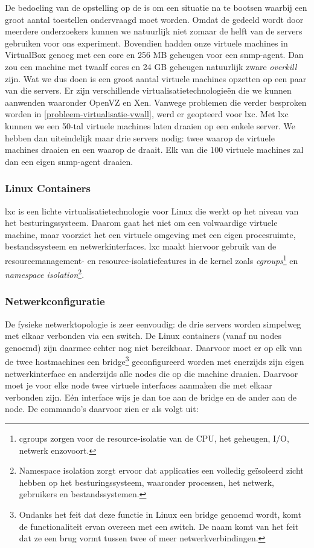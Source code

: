 De bedoeling van de opstelling op de \vwall{}  is om een situatie na te bootsen waarbij een groot aantal toestellen ondervraagd moet worden.
Omdat de \vwall{} gedeeld wordt door meerdere onderzoekers kunnen we natuurlijk niet zomaar de helft van de servers gebruiken voor ons experiment.
Bovendien hadden onze virtuele machines in VirtualBox genoeg met een core en 256 MB geheugen voor een \gls{snmp-agent}.
Dan zou een machine met twaalf cores en 24 GB geheugen natuurlijk zware \textit{overkill} zijn.
Wat we dus doen is een groot aantal virtuele machines opzetten op een paar van die servers.
Er zijn verschillende virtualisatietechnologieën die we kunnen aanwenden waaronder OpenVZ en Xen.
Vanwege problemen die verder besproken worden in \cref{probleem-virtualisatie-vwall}, werd er geopteerd voor \gls{lxc}.
Met \gls{lxc} kunnen we een 50-tal virtuele machines laten draaien op een enkele server.
We hebben dan uiteindelijk maar drie servers nodig: twee waarop de virtuele machines draaien en een waarop de \nwmretriever{} draait.
Elk van die 100 virtuele machines zal dan een eigen \gls{snmp-agent} draaien.

\subsubsection{Linux Containers}
\label{lxc}

\gls{lxc} is een lichte virtualisatietechnologie voor Linux die werkt op het niveau van het besturingssysteem.
Daarom gaat het niet om een volwaardige virtuele machine, maar voorziet het een virtuele omgeving met een eigen procesruimte, bestandssysteem en netwerkinterfaces.
\gls{lxc} maakt hiervoor gebruik van de resourcemanagement- en resource-isolatiefeatures in de kernel zoals \textit{\gls{cgroups}}\footnote{
	\gls{cgroups} zorgen voor de resource-isolatie van de CPU, het geheugen, I/O, netwerk enzovoort\cite{lxc-wiki}.
} en \textit{namespace isolation}\footnote{
	Namespace isolation zorgt ervoor dat applicaties een volledig geïsoleerd zicht hebben op het besturingssysteem,
	waaronder processen, het netwerk, gebruikers en bestandssystemen\cite{lxc-wiki}.
}\cite{lxc-explained, lxc-wiki}.


\subsubsection{Netwerkconfiguratie}

De fysieke netwerktopologie is zeer eenvoudig: de drie servers worden simpelweg met elkaar verbonden via een switch.
De Linux containers (vanaf nu nodes genoemd) zijn daarmee echter nog niet bereikbaar.
Daarvoor moet er op elk van de twee hostmachines een bridge\footnote{
	Ondanks het feit dat deze functie in Linux een bridge genoemd wordt, komt de functionaliteit ervan overeen met een switch.
	De naam komt van het feit dat ze een brug vormt tussen twee of meer netwerkverbindingen.
} geconfigureerd worden met enerzijds zijn eigen netwerkinterface
en anderzijds alle nodes die op die machine draaien.
Daarvoor moet je voor elke node twee virtuele interfaces aanmaken die met elkaar verbonden zijn.
Eén interface wijs je dan toe aan de bridge en de ander aan de node\cite{lxc-config}.
De commando's daarvoor zien er als volgt uit:

